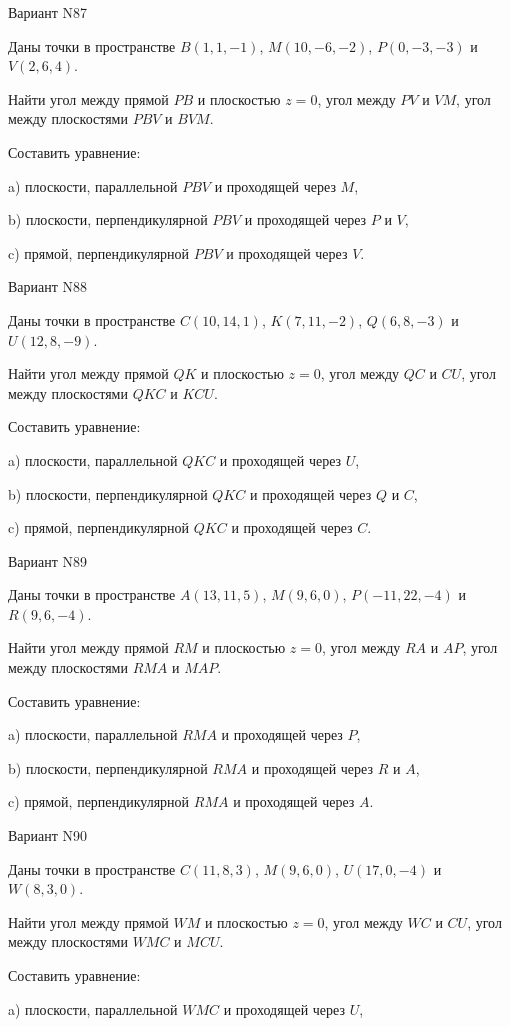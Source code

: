 \documentclass[11pt]{report}
\begin{document}
Вариант N87

Даны точки в пространстве
$B(1, 1, -1)$, $M(10, -6, -2)$, $P(0, -3, -3)$ и
$V(2, 6, 4)$.

Найти угол между прямой $PB$ и плоскостью $z = 0$, угол между $PV$ и $VM$, угол между плоскостями $PBV$ 
и $BVM$.

Составить уравнение: 

a) плоскости, параллельной $PBV$ и проходящей через $M$,

b) плоскости, перпендикулярной $PBV$ и проходящей через $P$ и $V$,

c) прямой, перпендикулярной $PBV$ и проходящей через $V$.

Вариант N88

Даны точки в пространстве
$C(10, 14, 1)$, $K(7, 11, -2)$, $Q(6, 8, -3)$ и
$U(12, 8, -9)$.

Найти угол между прямой $QK$ и плоскостью $z = 0$, угол между $QC$ и $CU$, угол между плоскостями $QKC$ 
и $KCU$.

Составить уравнение: 

a) плоскости, параллельной $QKC$ и проходящей через $U$,

b) плоскости, перпендикулярной $QKC$ и проходящей через $Q$ и $C$,

c) прямой, перпендикулярной $QKC$ и проходящей через $C$.

Вариант N89

Даны точки в пространстве
$A(13, 11, 5)$, $M(9, 6, 0)$, $P(-11, 22, -4)$ и
$R(9, 6, -4)$.

Найти угол между прямой $RM$ и плоскостью $z = 0$, угол между $RA$ и $AP$, угол между плоскостями $RMA$ 
и $MAP$.

Составить уравнение: 

a) плоскости, параллельной $RMA$ и проходящей через $P$,

b) плоскости, перпендикулярной $RMA$ и проходящей через $R$ и $A$,

c) прямой, перпендикулярной $RMA$ и проходящей через $A$.

Вариант N90

Даны точки в пространстве
$C(11, 8, 3)$, $M(9, 6, 0)$, $U(17, 0, -4)$ и
$W(8, 3, 0)$.

Найти угол между прямой $WM$ и плоскостью $z = 0$, угол между $WC$ и $CU$, угол между плоскостями $WMC$ 
и $MCU$.

Составить уравнение: 

a) плоскости, параллельной $WMC$ и проходящей через $U$,
\end{document}
